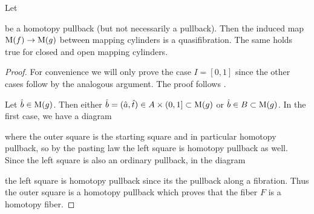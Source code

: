 \begin{lemma}\label{lem:mapOfCylIsQuasiFib} %
    Let 
    \begin{center}
    \end{center}
    be a homotopy pullback (but not necessarily a pullback).
    Then the induced map $\operatorname{M}(f)\to\operatorname{M}(g)$ between mapping cylinders is a quasifibration.
    The same holds true for closed and open mapping cylinders.
    \begin{proof}
        For convenience we will only prove the case $I=[0,1]$ since the other cases follow by the analogous argument.
        The proof follows \cite[Lemma 5.10.6]{cubical_htpy_theory}.

        Let $\hat{b}\in\operatorname{M}(g)$. 
        Then either $\hat{b}=(\hat{a},\hat{t})\in A\times(0,1]\subset\operatorname{M}(g)$ or $\hat{b}\in B\subset\operatorname{M}(g)$.
        In the first case, we have a diagram
        \begin{center}
        \end{center}
        where the outer square is the starting square and in particular homotopy pullback, so by the pasting law the left square is homotopy pullback as well.
        Since the left square is also an ordinary pullback, in the diagram
        \begin{center}
        \end{center}
        the left square is homotopy pullback since its the pullback along a fibration.
        Thus the outer square is a homotopy pullback which proves that the fiber $F$ is a homotopy fiber.


\end{proof}
\end{lemma}
